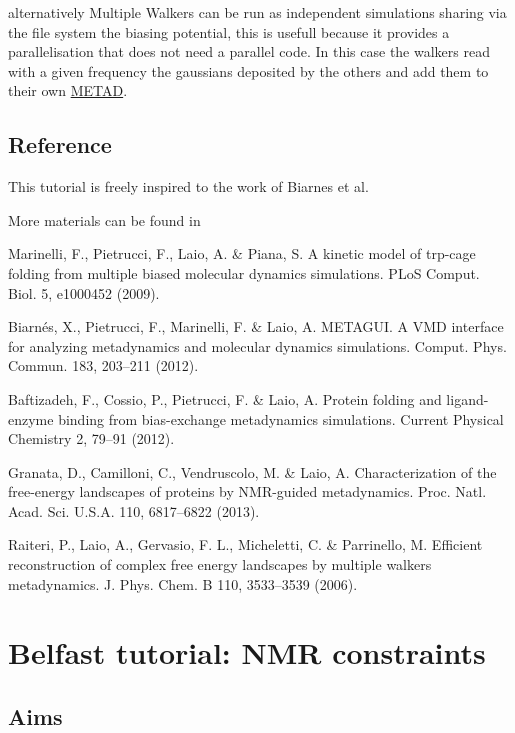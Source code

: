 alternatively Multiple Walkers can be run as independent simulations sharing via the file system the biasing potential, this is usefull because it provides a parallelisation that does not need a parallel code. In this case the walkers read with a given frequency the gaussians deposited by the others and add them to their own \hyperlink{METAD}{M\+E\+T\+A\+D}.\hypertarget{belfast-9_refer}{}\subsection{Reference}\label{belfast-9_refer}
This tutorial is freely inspired to the work of Biarnes et al.

More materials can be found in


\begin{DoxyEnumerate}
\item Marinelli, F., Pietrucci, F., Laio, A. \& Piana, S. A kinetic model of trp-\/cage folding from multiple biased molecular dynamics simulations. P\+Lo\+S Comput. Biol. 5, e1000452 (2009).
\item Biarnés, X., Pietrucci, F., Marinelli, F. \& Laio, A. M\+E\+T\+A\+G\+U\+I. A V\+M\+D interface for analyzing metadynamics and molecular dynamics simulations. Comput. Phys. Commun. 183, 203–211 (2012).
\item Baftizadeh, F., Cossio, P., Pietrucci, F. \& Laio, A. Protein folding and ligand-\/enzyme binding from bias-\/exchange metadynamics simulations. Current Physical Chemistry 2, 79–91 (2012).
\item Granata, D., Camilloni, C., Vendruscolo, M. \& Laio, A. Characterization of the free-\/energy landscapes of proteins by N\+M\+R-\/guided metadynamics. Proc. Natl. Acad. Sci. U.\+S.\+A. 110, 6817–6822 (2013).
\item Raiteri, P., Laio, A., Gervasio, F. L., Micheletti, C. \& Parrinello, M. Efficient reconstruction of complex free energy landscapes by multiple walkers metadynamics. J. Phys. Chem. B 110, 3533–3539 (2006). 
\end{DoxyEnumerate}\hypertarget{belfast-9}{}\section{Belfast tutorial\+: N\+M\+R constraints}\label{belfast-9}
\hypertarget{belfast-10_Aims}{}\subsection{Aims}\label{belfast-10_Aims}
